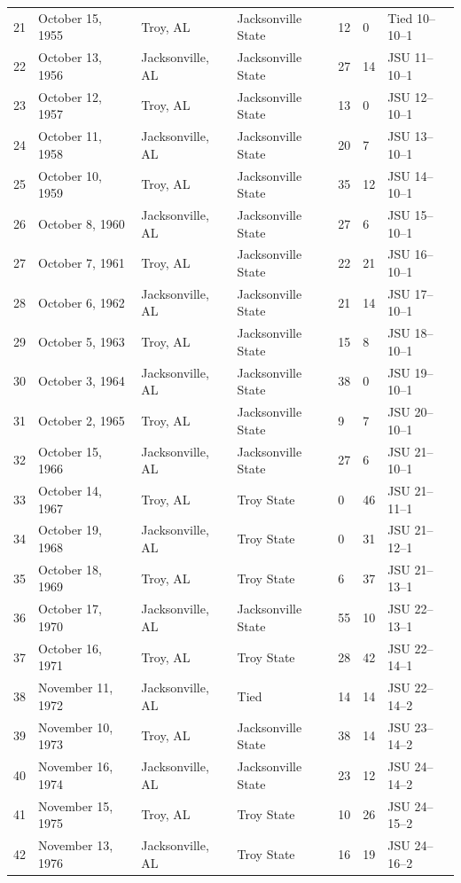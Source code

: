 \documentclass{article}
\begin{document}
\begin{tabular}{lllllll}
21 & October 15, 1955 & Troy, AL & Jacksonville State & 12 & 0 & Tied 10–10–1 \\
22 & October 13, 1956 & Jacksonville, AL & Jacksonville State & 27 & 14 & JSU 11–10–1 \\
23 & October 12, 1957 & Troy, AL & Jacksonville State & 13 & 0 & JSU 12–10–1 \\
24 & October 11, 1958 & Jacksonville, AL & Jacksonville State & 20 & 7 & JSU 13–10–1 \\
25 & October 10, 1959 & Troy, AL & Jacksonville State & 35 & 12 & JSU 14–10–1 \\
26 & October 8, 1960 & Jacksonville, AL & Jacksonville State & 27 & 6 & JSU 15–10–1 \\
27 & October 7, 1961 & Troy, AL & Jacksonville State & 22 & 21 & JSU 16–10–1 \\
28 & October 6, 1962 & Jacksonville, AL & Jacksonville State & 21 & 14 & JSU 17–10–1 \\
29 & October 5, 1963 & Troy, AL & Jacksonville State & 15 & 8 & JSU 18–10–1 \\
30 & October 3, 1964 & Jacksonville, AL & Jacksonville State & 38 & 0 & JSU 19–10–1 \\
31 & October 2, 1965 & Troy, AL & Jacksonville State & 9 & 7 & JSU 20–10–1 \\
32 & October 15, 1966 & Jacksonville, AL & Jacksonville State & 27 & 6 & JSU 21–10–1 \\
33 & October 14, 1967 & Troy, AL & Troy State & 0 & 46 & JSU 21–11–1 \\
34 & October 19, 1968 & Jacksonville, AL & Troy State & 0 & 31 & JSU 21–12–1 \\
35 & October 18, 1969 & Troy, AL & Troy State & 6 & 37 & JSU 21–13–1 \\
36 & October 17, 1970 & Jacksonville, AL & Jacksonville State & 55 & 10 & JSU 22–13–1 \\
37 & October 16, 1971 & Troy, AL & Troy State & 28 & 42 & JSU 22–14–1 \\
38 & November 11, 1972 & Jacksonville, AL & Tied & 14 & 14 & JSU 22–14–2 \\
39 & November 10, 1973 & Troy, AL & Jacksonville State & 38 & 14 & JSU 23–14–2 \\
40 & November 16, 1974 & Jacksonville, AL & Jacksonville State & 23 & 12 & JSU 24–14–2 \\
41 & November 15, 1975 & Troy, AL & Troy State & 10 & 26 & JSU 24–15–2 \\
42 & November 13, 1976 & Jacksonville, AL & Troy State & 16 & 19 & JSU 24–16–2 \\

\end{tabular}
\end{document}
